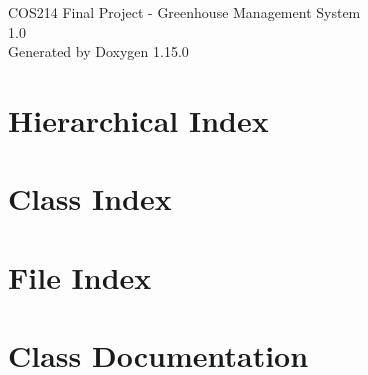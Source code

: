 \documentclass[twoside]{book}
\newcommand{\+}{\discretionary{\mbox{\scriptsize$\hookleftarrow$}}{}{}}
\newcommand{\clearemptydoublepage}{%
    \newpage{\pagestyle{empty}\cleardoublepage}%
  }
\begin{document}
  \raggedbottom
    \hypersetup{pageanchor=false,
                bookmarksnumbered=true,
                pdfencoding=unicode
               }
  \begin{titlepage}
  \vspace*{7cm}
  \begin{center}%
  {\Large COS214 Final Project -\/ Greenhouse Management System}\\
  [1ex]\large 1.\+0 \\
  \vspace*{1cm}
  {\large Generated by Doxygen 1.15.0}\\
  \end{center}
  \end{titlepage}
  \clearemptydoublepage
  \tableofcontents
  \clearemptydoublepage
  \hypersetup{pageanchor=true}

\chapter{Hierarchical Index}

\chapter{Class Index}

\chapter{File Index}

\chapter{Class Documentation}














































\end{document}

